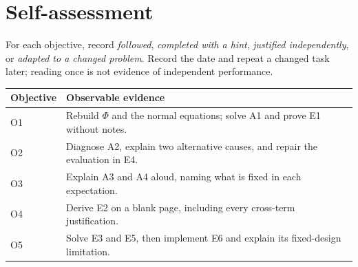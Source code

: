 \section*{Self-assessment}
For each objective, record \emph{followed}, \emph{completed with a hint}, \emph{justified independently}, or \emph{adapted to a changed problem}. Record the date and repeat a changed task later; reading once is not evidence of independent performance.
\begin{center}\small
\begin{tabular}{p{.12\linewidth}p{.78\linewidth}}
\toprule Objective & Observable evidence\\\midrule
O1 & Rebuild $\Phi$ and the normal equations; solve A1 and prove E1 without notes.\\
O2 & Diagnose A2, explain two alternative causes, and repair the evaluation in E4.\\
O3 & Explain A3 and A4 aloud, naming what is fixed in each expectation.\\
O4 & Derive E2 on a blank page, including every cross-term justification.\\
O5 & Solve E3 and E5, then implement E6 and explain its fixed-design limitation.\\\bottomrule
\end{tabular}
\end{center}
